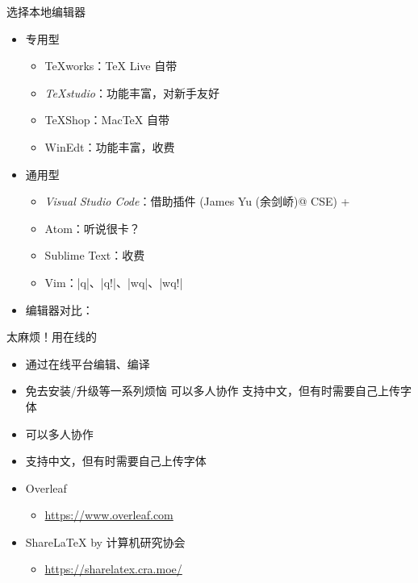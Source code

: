 \begin{frame}[fragile]{选择本地编辑器}
  \begin{itemize}
    \item<+-> 专用型
  
      \begin{itemize}
        \item TeXworks：\TeX{} Live 自带 \faWindows{} \faApple{} \faLinux{}
        \item \emph{TeXstudio}：功能丰富，对新手友好 \faWindows{} \faApple{} \faLinux{}
        \item TeXShop：Mac\TeX{} 自带 \faApple{}
        \item WinEdt：功能丰富，收费 \faWindows{}
      \end{itemize}
  
    \item<+-> 通用型
  
      \begin{itemize}
        \item \emph{Visual Studio Code}：借助插件  (James Yu (余剑峤)@ CSE) + 
        \item Atom：听说很卡？
        \item Sublime Text：收费
        \item Vim：|q|、|q!|、|wq|、|wq!|
      \end{itemize}

    \item<+-> 编辑器对比：
  \end{itemize}
\end{frame}


\begin{frame}[fragile]{太麻烦！用在线的}

    \begin{itemize}
        \item 通过在线平台编辑、编译
        \item 免去安装/升级等一系列烦恼 可以多人协作 支持中文，但有时需要自己上传字体
        \item 可以多人协作
        \item 支持中文，但有时需要自己上传字体
    \end{itemize}

    \begin{itemize}
      \item Overleaf
      \begin{itemize}
          \item \url{https://www.overleaf.com}
      \end{itemize}
      \item ShareLaTeX by 计算机研究协会
      \begin{itemize}
        \item \url{https://sharelatex.cra.moe/}
    \end{itemize}
      \end{itemize}
  \end{frame}

